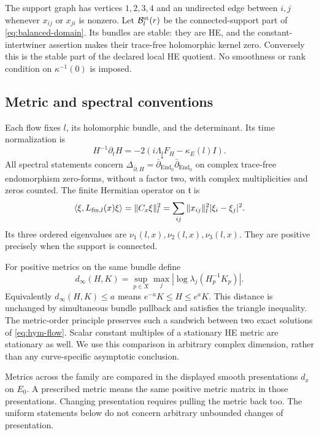 \documentclass[11pt]{amsart}
\theoremstyle{definition}
\theoremstyle{remark}
\newcommand{\End}{\operatorname{End}}
\begin{document}
The support graph has vertices $1,2,3,4$ and an undirected edge
between $i,j$ whenever $x_{ij}$ or $x_{ji}$ is nonzero.
Let $\mathcal B_l^{\rm st}(r)$ be the connected-support part of
\eqref{eq:balanced-domain}. Its bundles are stable: they are HE,
and the constant-intertwiner assertion makes their trace-free
holomorphic kernel zero. Conversely this is the stable part of
the declared local HE quotient. No smoothness or rank condition
on $\kappa^{-1}(0)$ is imposed.

\subsection{Metric and spectral conventions}
Each flow fixes $l$, its holomorphic bundle, and the determinant.
Its time normalization is
\begin{equation}\label{eq:hym-flow}
 H^{-1}\partial_tH=-2(i\Lambda_lF_H-\kappa_E(l)I).
\end{equation}
All spectral statements concern
$\Delta_{\bar\partial,H}=\bar\partial_{\End_0}^*
\bar\partial_{\End_0}$ on complex trace-free endomorphism zero-forms,
without a factor two, with complex multiplicities and zeros counted.
The finite Hermitian operator on $\mathfrak t$ is
\begin{equation}\label{eq:finite-operator}
 \langle\xi,L_{{\rm fin},l}(x)\xi\rangle
   =\|C_x\xi\|_l^2
   =\sum_{ij}\|x_{ij}\|_l^2|\xi_i-\xi_j|^2.
\end{equation}
Its three ordered eigenvalues are $\nu_1(l,x),\nu_2(l,x),\nu_3(l,x)$.
They are positive precisely when the support is connected.

For positive metrics on the same bundle define
\begin{equation}\label{eq:order-distance}
 d_\infty(H,K)=\sup_{p\in X}\max_j
       |\log\lambda_j(H_p^{-1}K_p)|.
\end{equation}
Equivalently $d_\infty(H,K)\le a$ means
$e^{-a}K\le H\le e^aK$. This distance is unchanged by simultaneous
bundle pullback and satisfies the triangle inequality.
The metric-order principle \cite[Proposition 4.3]{HKKP18}
preserves such a sandwich between two exact solutions of
\eqref{eq:hym-flow}. Scalar constant multiples of a stationary HE
metric are stationary as well. We use this comparison in arbitrary
complex dimension, rather than any curve-specific asymptotic conclusion.

Metrics across the family are compared in the displayed smooth
presentations $d_x$ on $E_0$. A prescribed metric means the same
positive metric matrix in those presentations. Changing presentation
requires pulling the metric back too. The uniform statements below
do not concern arbitrary unbounded changes of presentation.
\end{document}
